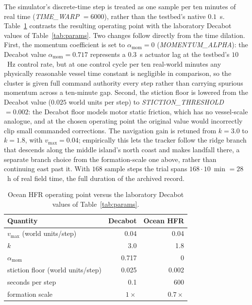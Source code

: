 \documentclass[12pt, letterpaper, oneside]{report}
\begin{document}
The simulator's discrete-time step is treated as one sample per ten
minutes of real time (\textit{TIME\_WARP} $= 6000$), rather than the
testbed's native $0.1$~s. Table~\ref{tab:ocean_params} contrasts the
resulting operating point with the laboratory Decabot values of
Table~\ref{tab:params}. Two changes follow directly from the time
dilation. First, the momentum coefficient is set to
$\alpha_{\text{mom}} = 0$ (\textit{MOMENTUM\_ALPHA}): the Decabot value
$\alpha_{\text{mom}} = 0.717$ represents a $0.3$~s actuator lag at the
testbed's $10$~Hz control rate, but at one control cycle per ten
real-world minutes any physically reasonable vessel time constant is
negligible in comparison, so the cluster is given full command
authority every step rather than carrying spurious momentum across a
ten-minute gap. Second, the stiction floor is lowered from the
Decabot value ($0.025$ world units per step) to \textit{STICTION\_THRESHOLD}
$= 0.002$: the Decabot floor models motor static friction, which has no
vessel-scale analogue, and at the chosen operating point the original
value would incorrectly clip small commanded corrections. The
navigation gain is retuned from $k = 3.0$ to $k = 1.8$, with
$v_{\max} = 0.04$; empirically this lets the tracker follow the ridge
branch that descends along the middle island's north coast and makes
landfall there, a separate branch choice from the formation-scale one
above, rather than continuing east past it. With $168$ sample steps the trial spans
$168 \cdot 10$~min $= 28$~h of real field time, the full duration of
the archived record.

\begin{table}[!t]
\centering
\caption{Ocean HFR operating point versus the laboratory Decabot values of Table~\ref{tab:params}.}
\label{tab:ocean_params}
\footnotesize
\begin{tabular}{lrr}
\toprule
\textbf{Quantity} & \textbf{Decabot} & \textbf{Ocean HFR} \\
\midrule
$v_{\max}$ (world units/step) & 0.04 & 0.04 \\
$k$ & 3.0 & 1.8 \\
$\alpha_{\text{mom}}$ & 0.717 & 0 \\
stiction floor (world units/step) & 0.025 & 0.002 \\
seconds per step & 0.1 & 600 \\
formation scale & $1\times$ & $0.7\times$ \\
\bottomrule
\end{tabular}
\end{table}
\end{document}

